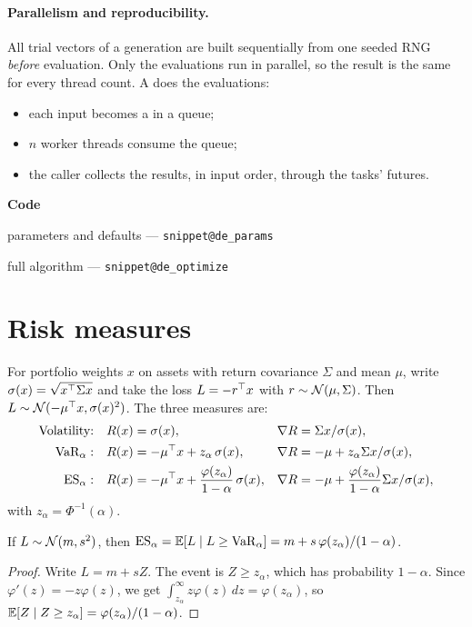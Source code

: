 \documentclass[11pt,a4paper]{article}
\makeatletter
\newcommand{\snippetsource}[1]{\csname snippet@#1\endcsname}
\newcommand{\snippet}[3]{%
  }
\newenvironment{codepointers}{%
  \par\smallskip\begingroup\footnotesize\noindent\textcolor{blue!50!black}{\textbf{Code}}\par\nopagebreak
  \begin{list}{}{\setlength{\leftmargin}{1.2em}\setlength{\itemsep}{0pt}\setlength{\parsep}{0pt}\setlength{\topsep}{1pt}}}%
  {\end{list}\endgroup\smallskip}
\newcommand{\codeitem}[2]{\item #2 --- \texttt{\snippetsource{#1}}}
\makeatother
\begin{document}
\paragraph{Parallelism and reproducibility.} All trial vectors of a generation are built
sequentially from one seeded RNG \emph{before} evaluation. Only the evaluations run in
parallel, so the result is the same for every thread count. A 
does the evaluations:
\begin{itemize}
  \item each input becomes a  in a queue;
  \item $n$ worker threads consume the queue;
  \item the caller collects the results, in input order, through the tasks' futures.
\end{itemize}
\snippet{de_generation}{C++}{Mutation and crossover of one generation}
\snippet{parallel_evaluator}{C++}{ParallelEvaluator: job queue, consumers, futures}
\begin{codepointers}
  \codeitem{de_params}{parameters and defaults}
  \codeitem{de_optimize}{full algorithm}
\end{codepointers}

\section{Risk measures}\label{sec:risk}

For portfolio weights $x$ on assets with return covariance $\Sigma$ and mean $\mu$, write
$\sigma(x)=\sqrt{x^\top\Sigma x}$ and take the loss $L=-r^\top x$ with $r\sim\mathcal{N}(\mu,\Sigma)$. Then
$L\sim\mathcal{N}(-\mu^\top x,\sigma(x)^2)$. The three measures are:
\begin{align*}
  \text{Volatility:}\quad & R(x)=\sigma(x), & \nabla R &= \Sigma x/\sigma(x),\\
  \text{VaR}_\alpha:\quad & R(x)=-\mu^\top x+z_\alpha\,\sigma(x), & \nabla R&=-\mu+z_\alpha\Sigma x/\sigma(x),\\
  \text{ES}_\alpha:\quad & R(x)=-\mu^\top x+\frac{\varphi(z_\alpha)}{1-\alpha}\,\sigma(x), & \nabla R&=-\mu+\frac{\varphi(z_\alpha)}{1-\alpha}\Sigma x/\sigma(x),
\end{align*}
with $z_\alpha=\Phi^{-1}(\alpha)$.

\begin{proposition}
If $L\sim\mathcal{N}(m,s^2)$, then
$\mathrm{ES}_\alpha=\mathbb{E}[L\mid L\ge\mathrm{VaR}_\alpha]=m+s\,\varphi(z_\alpha)/(1-\alpha)$.
\end{proposition}
\begin{proof}
Write $L=m+sZ$. The event is $Z\ge z_\alpha$, which has probability $1-\alpha$. Since
$\varphi'(z)=-z\varphi(z)$, we get $\int_{z_\alpha}^\infty z\varphi(z)\,dz=\varphi(z_\alpha)$,
so $\mathbb{E}[Z\mid Z\ge z_\alpha]=\varphi(z_\alpha)/(1-\alpha)$.
\end{proof}
\end{document}
